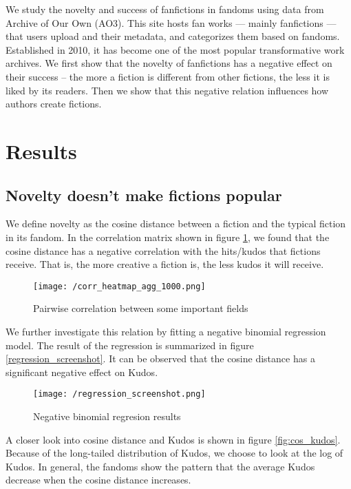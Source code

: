 \documentclass[11pt]{article} %
\begin{document}
We study the novelty and success of fanfictions in fandoms using data from Archive of Our Own (AO3). This site hosts fan works --- mainly fanfictions --- that users upload and their metadata, and categorizes them based on fandoms. Established in 2010, it has become one of the most popular transformative work archives. We first show that the novelty of fanfictions has a negative effect on their success -- the more a fiction is different from other fictions, the less it is liked by its readers. Then we show that this negative relation influences how authors create fictions.


\section{Results} %
\label{sec:results}
\subsection{Novelty doesn't make fictions popular}
We define novelty as the cosine distance between a fiction and the typical fiction in its fandom. In the correlation matrix shown in figure \ref{fig:corr_heatmap}, we found that the cosine distance has a negative correlation with the hits/kudos that fictions receive. That is, the more creative a fiction is, the less kudos it will receive.

\begin{figure}[htbp]
\begin{center}
\texttt{[image: /corr\_heatmap\_agg\_1000.png]}
\caption{Pairwise correlation between some important fields }
\label{fig:corr_heatmap}
\end{center}
\end{figure}

We further investigate this relation by fitting a negative binomial regression model. The result of the regression is summarized in figure \ref{regression_screenshot}. It can be observed that the cosine distance has a significant negative effect on Kudos.

\begin{figure}[htbp]
\begin{center}
\texttt{[image: /regression\_screenshot.png]}
\caption{Negative binomial regresion results}
\label{fig:regression}
\end{center}
\end{figure}

A closer look into cosine distance and Kudos is shown in figure \ref{fig:cos_kudos}. Because of the long-tailed distribution of Kudos, we choose to look at the log of Kudos. In general, the fandoms show the pattern that the average Kudos decrease when the cosine distance increases.
\end{document}
